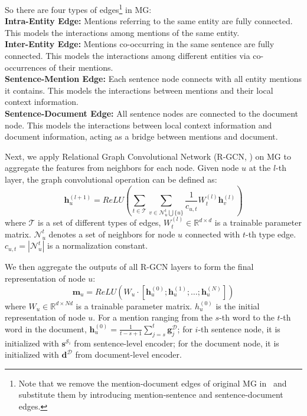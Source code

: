 \documentclass[11pt,a4paper]{article}
\begin{document}
So there are four types of edges\footnote{Note that we remove the mention-document edges of original MG in~\citep{GAIN} and substitute them by introducing mention-sentence and sentence-document edges.} in MG: \\
\noindent
\textbf{Intra-Entity Edge:} Mentions referring to the same entity are fully connected. This models the interactions among mentions of the same entity.\\
\noindent
\textbf{Inter-Entity Edge:} Mentions co-occurring in the same sentence are fully connected. This models the interactions among different entities via co-occurrences of their mentions. \\
\noindent
\textbf{Sentence-Mention Edge:} Each sentence node connects with all entity mentions it contains. This models the interactions between mentions and their local context information. \\
\noindent
\textbf{Sentence-Document Edge:} All sentence nodes are connected to the document node. This models the interactions between local context information and document information, acting as a bridge between mentions and document.

Next, we apply Relational Graph Convolutional Network (R-GCN, \citealp{RGCN}) on MG to aggregate the features from neighbors for each node. Given node $u$ at the $l$-th layer, the graph convolutional operation can be defined as:
\begin{equation}
       \textbf{h}_{u}^{(l + 1)} = ReLU \left(\sum_{t\in\mathcal{T}}\sum_{v\in\mathcal{N}^{t}_{u}\bigcup \{u\}}  \frac{1}{c_{u,t}}W^{(l)}_t \textbf{h}_{v}^{(l)}\right)
\end{equation}
where $\mathcal{T}$ is a set of different types of edges, $W^{(l)}_t\in \mathbb{R}^{d\times d}$ is a trainable parameter matrix.
$\mathcal{N}^{t}_{u}$ denotes a set of neighbors for node $u$ connected with $t$-th type edge. $c_{u,t} = |\mathcal{N}^{t}_{u}|$ is a normalization constant.

We then aggregate the outputs of all R-GCN layers to form the final representation of node $u$:
\begin{equation}
    \textbf{m}_u = ReLU(W_u \cdot [\textbf{h}_{u}^{(0)}; \textbf{h}_{u}^{(1)}; \ldots; \textbf{h}_{u}^{(N)}])
\end{equation}
where $W_u \in \mathbb{R}^{d\times Nd}$ is a trainable parameter matrix. $h^{(0)}_u$ is the initial representation of node $u$. For a mention ranging from the $s$-th word to the $t$-th word in the document, $\textbf{h}^{(0)}_u = \frac{1}{t-s+1} \sum_{j=s}^{t} \textbf{g}^{\mathcal{D}}_{j}$; for $i$-th sentence node, it is initialized with $\textbf{s}^{\mathcal{S}_i}$ from sentence-level encoder; for the document node, it is initialized with $\textbf{d}^{\mathcal{D}}$ from document-level encoder.
\end{document}
